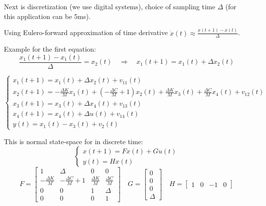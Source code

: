 \begin{exercise}
    Next is discretization (we use digital systems), choice of sampling time $\Delta$ (for this application can be 5ms).

    Using Eulero-forward approximation of time derivative $\dot{x}(t) \approx \frac{x(t+1)-x(t)}{\Delta}$.

    Example for the first equation:
    \[
        \frac{x_1(t+1)-x_1(t)}{\Delta} = x_2(t) \quad\Rightarrow\quad x_1(t+1) = x_1(t) + \Delta x_2(t)
    \]

    \[
        \begin{cases}
            x_1(t+1) = x_1(t) + \Delta x_2(t) + v_{11}(t) \\
            x_2(t+1) = -\frac{\Delta K}{M} x_1(t) + \left( -\frac{\Delta C}{M} + 1 \right)x_2(t) + \frac{\Delta K}{M} x_3(t) + \frac{\Delta C}{M} x_4(t) + v_{12}(t) \\
            x_3(t+1) = x_3(t) + \Delta x_4(t) + v_{13}(t) \\
            x_4(t+1) = x_4(t) + \Delta u(t) + v_{14}(t) \\
            y(t) = x_1(t) - x_3(t) + v_2(t)
        \end{cases}
    \]

    This is normal state-space for in discrete time:
    \[
        \begin{cases}
            x(t+1) = Fx(t) + Gu(t) \\
            y(t) = Hx(t)
        \end{cases}
    \]
    \[
        F = \begin{bmatrix}
            1 & \Delta & 0 & 0 \\
            -\frac{\Delta K}{M} & -\frac{\Delta C}{M}+1 & \frac{\Delta K}{M} & \frac{\Delta C}{M} \\
            0 & 0 & 1 & \Delta \\
            0 & 0 & 0 & 1
        \end{bmatrix}
        \quad G = \begin{bmatrix}
            0 \\ 0 \\ 0 \\ \Delta
        \end{bmatrix}
        \quad H = \begin{bmatrix}
            1 & 0 & -1 & 0
        \end{bmatrix}
    \]


\end{exercise}

